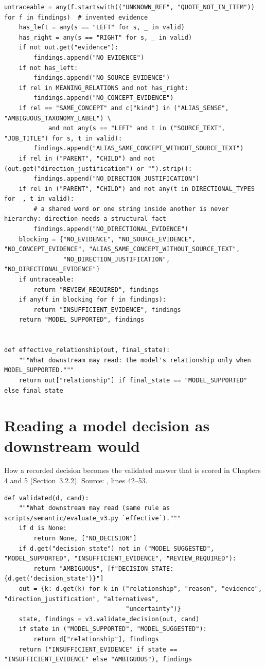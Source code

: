 \begin{lstlisting}[style=repo, firstnumber=280]
    untraceable = any(f.startswith(("UNKNOWN_REF", "QUOTE_NOT_IN_ITEM")) for f in findings)  # invented evidence
    has_left = any(s == "LEFT" for s, _ in valid)
    has_right = any(s == "RIGHT" for s, _ in valid)
    if not out.get("evidence"):
        findings.append("NO_EVIDENCE")
    if not has_left:
        findings.append("NO_SOURCE_EVIDENCE")
    if rel in MEANING_RELATIONS and not has_right:
        findings.append("NO_CONCEPT_EVIDENCE")
    if rel == "SAME_CONCEPT" and c["kind"] in ("ALIAS_SENSE", "AMBIGUOUS_TAXONOMY_LABEL") \
            and not any(s == "LEFT" and t in ("SOURCE_TEXT", "JOB_TITLE") for s, t in valid):
        findings.append("ALIAS_SAME_CONCEPT_WITHOUT_SOURCE_TEXT")
    if rel in ("PARENT", "CHILD") and not (out.get("direction_justification") or "").strip():
        findings.append("NO_DIRECTION_JUSTIFICATION")
    if rel in ("PARENT", "CHILD") and not any(t in DIRECTIONAL_TYPES for _, t in valid):
        # a shared word or one string inside another is never hierarchy: direction needs a structural fact
        findings.append("NO_DIRECTIONAL_EVIDENCE")
    blocking = {"NO_EVIDENCE", "NO_SOURCE_EVIDENCE", "NO_CONCEPT_EVIDENCE", "ALIAS_SAME_CONCEPT_WITHOUT_SOURCE_TEXT",
                "NO_DIRECTION_JUSTIFICATION", "NO_DIRECTIONAL_EVIDENCE"}
    if untraceable:
        return "REVIEW_REQUIRED", findings
    if any(f in blocking for f in findings):
        return "INSUFFICIENT_EVIDENCE", findings
    return "MODEL_SUPPORTED", findings


def effective_relationship(out, final_state):
    """What downstream may read: the model's relationship only when MODEL_SUPPORTED."""
    return out["relationship"] if final_state == "MODEL_SUPPORTED" else final_state
\end{lstlisting}

\section{Reading a model decision as downstream would}
\label{app:A4}
How a recorded decision becomes the validated answer that is scored in Chapters 4 and 5 (Section~3.2.2). Source: , lines 42--53.

\begin{lstlisting}[style=repo, firstnumber=42]
def validated(d, cand):
    """What downstream may read (same rule as scripts/semantic/evaluate_v3.py `effective`)."""
    if d is None:
        return None, ["NO_DECISION"]
    if d.get("decision_state") not in ("MODEL_SUGGESTED", "MODEL_SUPPORTED", "INSUFFICIENT_EVIDENCE", "REVIEW_REQUIRED"):
        return "AMBIGUOUS", [f"DECISION_STATE:{d.get('decision_state')}"]
    out = {k: d.get(k) for k in ("relationship", "reason", "evidence", "direction_justification", "alternatives",
                                 "uncertainty")}
    state, findings = v3.validate_decision(out, cand)
    if state in ("MODEL_SUPPORTED", "MODEL_SUGGESTED"):
        return d["relationship"], findings
    return ("INSUFFICIENT_EVIDENCE" if state == "INSUFFICIENT_EVIDENCE" else "AMBIGUOUS"), findings
\end{lstlisting}

